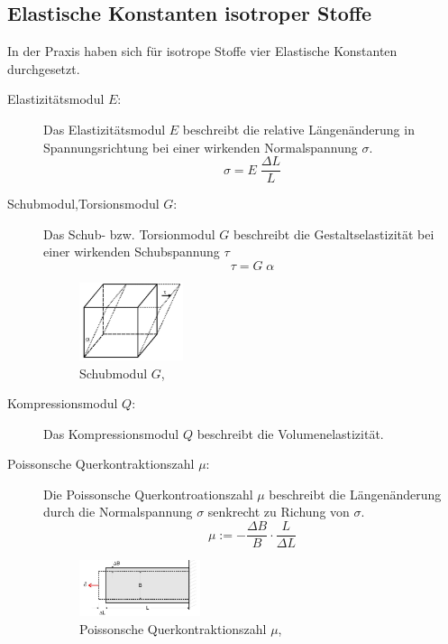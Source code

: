 \subsection{Elastische Konstanten isotroper Stoffe}
In der Praxis haben sich für isotrope Stoffe vier Elastische Konstanten durchgesetzt.\\
\begin{description}
\item[Elastizitätsmodul $E$:]
    Das Elastizitätsmodul $E$ beschreibt die relative Längenänderung in Spannungsrichtung
    bei einer wirkenden Normalspannung $\sigma$.
    \begin{equation}
        \sigma = E \; \frac{\Delta L}{L}
        \label{eqn:def_elastizitätsmodul}
    \end{equation}

\item[Schubmodul,Torsionsmodul $G$:]
    Das Schub- bzw. Torsionmodul $G$ beschreibt die Gestaltselastizität bei einer
    wirkenden Schubspannung $\tau$
    \begin{equation}
        \tau = G \; \alpha
        \label{eqn:def_schubmodul}
    \end{equation}
    
    \begin{figure}[h]
        \centering
        \includegraphics[width=0.3\textwidth, height=0.2\textwidth]{bilder/Schubmodul.jpg}
        \caption{Schubmodul $G$,\cite[4]{Anleitung}}        
        \label{fig:schubmodul}
    \end{figure}

\item[Kompressionsmodul $Q$:]
    Das Kompressionsmodul $Q$ beschreibt die Volumenelastizität.

\newpage
\item[Poissonsche Querkontraktionszahl $\mu$:]
    Die Poissonsche Querkontroationszahl $\mu$ beschreibt die Längenänderung durch die Normalspannung $\sigma$
    senkrecht zu Richung von $\sigma$.
    \begin{equation}
        \mu := -\frac{\Delta B}{B} \cdot \frac{L}{\Delta L}
        \label{eqn:def_poissonsche}
    \end{equation}
    
    \begin{figure}[h]
        \centering
        \includegraphics[width=0.35\textwidth, height=0.15\textwidth]{bilder/Poissonsche_Quer.jpg}
        \caption{Poissonsche Querkontraktionszahl $\mu$,\cite[3]{Anleitung}}        
        \label{fig:poissonsche_Quer}
    \end{figure}
\end{description}


